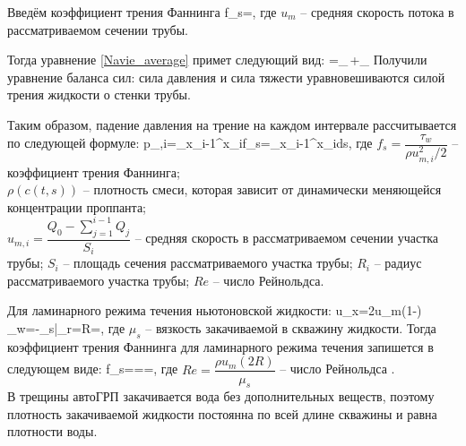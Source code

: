 Введём коэффициент трения Фаннинга
\beq
f_s=,
\eeq
где $u_m$ -- средняя скорость потока в рассматриваемом сечении трубы.

Тогда уравнение \eqref{Navie_average} примет следующий вид:
\beq
{}=_{}\,+_{}
\eeq
Получили уравнение баланса сил: сила давления и сила тяжести уравновешиваются силой трения жидкости о стенки трубы.

Таким образом, падение давления на трение на каждом интервале рассчитывается по следующей формуле:
\beq\label{3_5}
\Delta p_{,i}=\int\limits_{x_{i-1}}^{x_i}{f_s}=\int\limits_{x_{i-1}}^{x_i}{}ds,
\eeq
где $f_s=\dfrac{\tau_w}{\rho u_{m,i}^2/2}$ -- коэффициент трения Фаннинга;\newline\\
$\rho(c(t,s))$ -- плотность смеси, которая зависит от динамически меняющейся концентрации проппанта;\newline\\
$u_{m,i}=\dfrac{Q_0-\sum\limits_{j=1}^{i-1}{Q_j}}{S_i}$ -- средняя скорость в рассматриваемом сечении участка трубы;\newline
$S_i$ -- площадь сечения рассматриваемого участка трубы;\newline
$R_i$ -- радиус рассматриваемого участка трубы;\newline
$Re$ -- число Рейнольдса.

Для ламинарного режима течения ньютоновской жидкости:
\beq
u_x=2u_m\left(1-\right)\,\,\,\,\,\,\tau_w=-\mu_s\bigg|_{r=R}=,
\eeq
где $\mu_s$ -- вязкость закачиваемой в скважину жидкости.\newline
Тогда коэффициент трения Фаннинга для ламинарного режима течения запишется в следующем виде:
\beq
f_s===,
\eeq
где $Re=\dfrac{\rho u_m\left(2R\right)}{\mu_s}$ -- число Рейнольдса \cite{reynolds}.\\

В трещины автоГРП закачивается вода без дополнительных веществ, поэтому плотность закачиваемой жидкости постоянна по всей длине скважины и равна плотности воды.

